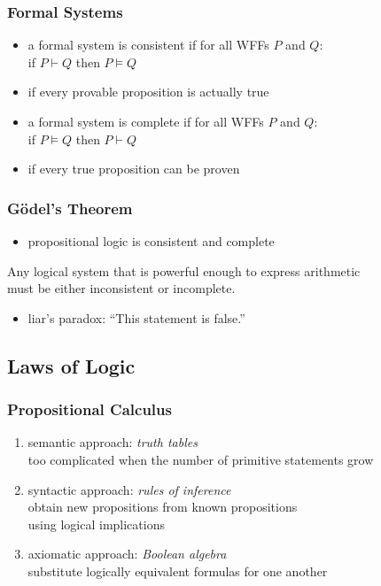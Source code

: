 \documentclass[dvipsnames]{beamer}
\begin{document}
\begin{frame}
  \frametitle{Formal Systems}

  \begin{itemize}
    \item a formal system is \alert{consistent} if for all WFFs $P$ and $Q$:\\
      if $P \vdash Q$ then $P \vDash Q$
    \item if every provable proposition is actually true

    \pause
    \bigskip
    \item a formal system is \alert{complete} if for all WFFs $P$ and $Q$:\\
        if $P \vDash Q$ then $P \vdash Q$
    \item if every true proposition can be proven
  \end{itemize}
\end{frame}

\begin{frame}
  \frametitle{Gödel's Theorem}

  \begin{itemize}
    \item propositional logic is consistent and complete
  \end{itemize}

  \pause
  \begin{theorem}
    Any logical system that is powerful enough to express arithmetic\\
    must be either inconsistent or incomplete.
  \end{theorem}

  \pause
  \medskip
  \begin{itemize}
    \item liar's paradox: ``This statement is false.''
  \end{itemize}
\end{frame}

\subsection{Laws of Logic}

\begin{frame}
  \frametitle{Propositional Calculus}

  \begin{enumerate}
    \item semantic approach: \emph{truth tables}\\
      too complicated when the number of primitive statements grow

    \pause
    \medskip
    \item syntactic approach: \emph{rules of inference}\\
      obtain new propositions from known propositions\\
      using logical implications

    \pause
    \medskip
    \item axiomatic approach: \emph{Boolean algebra}\\
      substitute logically equivalent formulas for one another
  \end{enumerate}
\end{frame}
\end{document}
